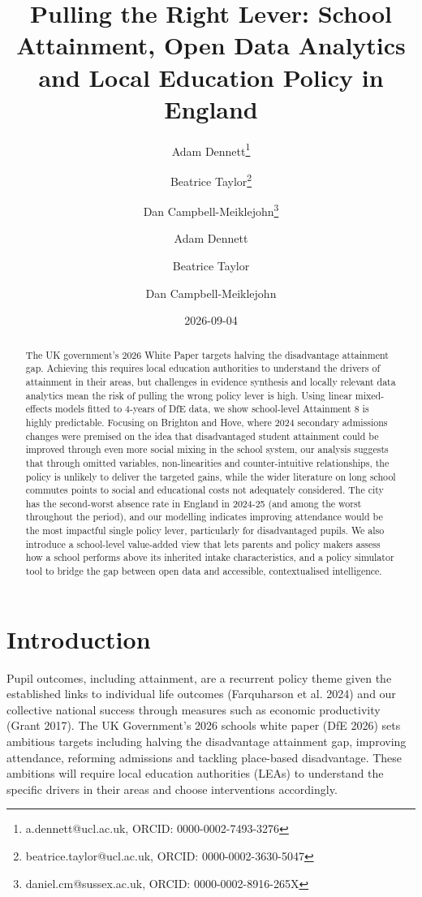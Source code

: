 \documentclass[
  12pt,
  titlepage]{article}
\author[1]{Adam Dennett\thanks{a.dennett@ucl.ac.uk, ORCID: 0000-0002-7493-3276}}
\author[1]{Beatrice Taylor\thanks{beatrice.taylor@ucl.ac.uk, ORCID: 0000-0002-3630-5047 }}
\author[3]{Dan Campbell-Meiklejohn\thanks{daniel.cm@sussex.ac.uk, ORCID: 0000-0002-8916-265X}}
\affil[1]{Bartlett Centre for Advanced Spatial Analysis, University College London}
\affil[3]{School of Psychology, University of Sussex}
\title{Pulling the Right Lever: School Attainment, Open Data Analytics
and Local Education Policy in England}
\author{Adam Dennett \and Beatrice Taylor \and Dan Campbell-Meiklejohn}
\date{2026-09-04}
\begin{document}
\maketitle
\begin{abstract}
The UK government's 2026 White Paper targets halving the disadvantage
attainment gap. Achieving this requires local education authorities to
understand the drivers of attainment in their areas, but challenges in
evidence synthesis and locally relevant data analytics mean the risk of
pulling the wrong policy lever is high. Using linear mixed-effects
models fitted to 4-years of DfE data, we show school-level Attainment 8
is highly predictable. Focusing on Brighton and Hove, where 2024
secondary admissions changes were premised on the idea that
disadvantaged student attainment could be improved through even more
social mixing in the school system, our analysis suggests that through
omitted variables, non-linearities and counter-intuitive relationships,
the policy is unlikely to deliver the targeted gains, while the wider
literature on long school commutes points to social and educational
costs not adequately considered. The city has the second-worst absence
rate in England in 2024-25 (and among the worst throughout the period),
and our modelling indicates improving attendance would be the most
impactful single policy lever, particularly for disadvantaged pupils. We
also introduce a school-level value-added view that lets parents and
policy makers assess how a school performs above its inherited intake
characteristics, and a policy simulator tool to bridge the gap between
open data and accessible, contextualised intelligence.
\end{abstract}


\section{Introduction}\label{introduction}

Pupil outcomes, including attainment, are a recurrent policy theme given
the established links to individual life outcomes (Farquharson et al.
2024) and our collective national success through measures such as
economic productivity (Grant 2017). The UK Government's 2026 schools
white paper (DfE 2026) sets ambitious targets including halving the
disadvantage attainment gap, improving attendance, reforming admissions
and tackling place-based disadvantage. These ambitions will require
local education authorities (LEAs) to understand the specific drivers in
their areas and choose interventions accordingly.
\end{document}
